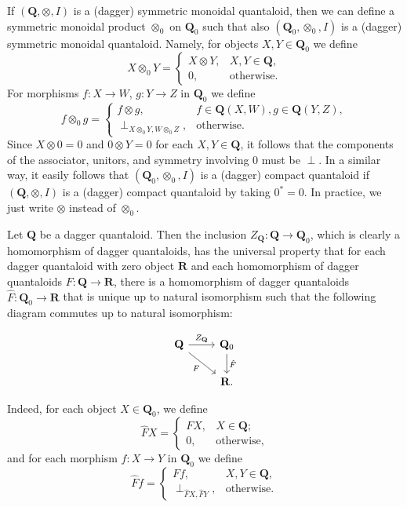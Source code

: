 \documentclass[12pt]{tac}
\theoremstyle{definition}
\theoremstyle{remark}
\newcommand{\<}{\langle}
\renewcommand{\>}{\rangle}
\renewcommand{\:}{\colon}
\begin{document}
If $(\mathbf Q,\otimes,I)$ is a (dagger) symmetric monoidal quantaloid, then we can define a symmetric monoidal product $\otimes_0$ on $\mathbf Q_0$ such that also $(\mathbf Q_0,\otimes_0,I)$ is a (dagger) symmetric monoidal quantaloid. Namely, for objects $X,Y\in\mathbf Q_0$ we define
\[ X\otimes_0 Y = \begin{cases} X\otimes Y, & X,Y\in\mathbf Q,\\
 0, & \text{otherwise}.
 \end{cases}\]
 For morphisms $f:X\to W$, $g:Y\to Z$ in $\mathbf Q_0$ we define
 \[f\otimes_0 g =\begin{cases} f\otimes g, &  f\in\mathbf Q(X,W), g\in\mathbf Q(Y,Z),\\
 \perp_{X\otimes_0 Y,W\otimes_0 Z}, & \text{otherwise}.
 \end{cases}\]
Since $X\otimes 0=0$ and $0\otimes Y=0$ for each $X,Y\in\mathbf Q$, it follows that the components of the associator, unitors, and symmetry involving $0$ must be $\perp$. 
In a similar way, it easily follows that $(\mathbf Q_0,\otimes_0,I)$ is a (dagger) compact quantaloid if  $(\mathbf Q,\otimes,I)$ is a (dagger) compact quantaloid by taking $0^*=0$.  
In practice, we just write $\otimes$ instead of $\otimes_0$.


Let $\mathbf Q$ be a dagger quantaloid. Then the inclusion $Z_\mathbf Q:\mathbf Q\to\mathbf Q_0$, which is clearly a homomorphism of dagger quantaloids, has the universal property that for each dagger quantaloid with zero object $\mathbf R$ and each homomorphism of dagger quantaloids $F:\mathbf Q\to\mathbf R$, there is a  homomorphism of dagger quantaloids $\hat F:\mathbf Q_0\to \mathbf R$ that is unique up to natural isomorphism such that the following diagram commutes up to natural isomorphism:

\[ \begin{tikzcd}
 \mathbf Q\ar{r}{Z_\mathbf Q}\ar{dr}[swap]{F} & \mathbf Q_0\ar{d}{\hat F}
  \\
  & \mathbf R.
\end{tikzcd} \]

Indeed, for each object $X\in\mathbf Q_0$, we define
\[ \hat FX  = \begin{cases}
FX, & X\in\mathbf Q;\\
0, & \text{otherwise},
\end{cases}
\]
and for each morphism $f:X\to Y$ in $\mathbf Q_0$ we define
\[\hat Ff =\begin{cases} Ff, & X,Y\in\mathbf Q,\\
\perp_{\hat FX,\hat FY}, & \text{otherwise}.
\end{cases}\]
\end{document}
